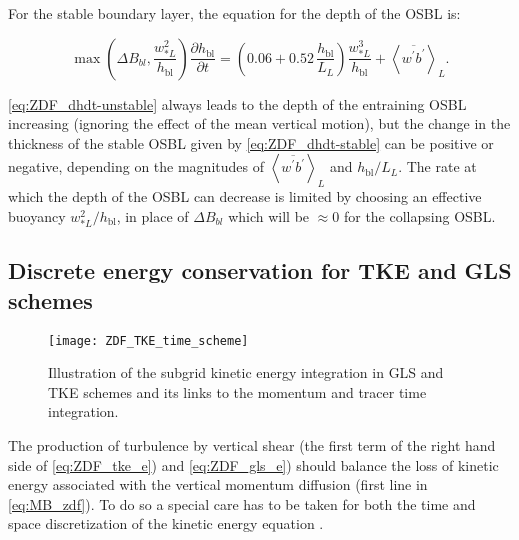 \documentclass[../main/NEMO_manual]{subfiles}
\begin{document}
For the stable boundary layer, the equation for the depth of the OSBL is:

\begin{equation}
  \label{eq:ZDF_dhdt-stable}
\max\left(\Delta B_{bl},\frac{w_{*L}^2}{h_\mathrm{bl}}\right)\frac{\partial h_\mathrm{bl}}{\partial t} = \left(0.06 + 0.52\,\frac{ h_\mathrm{bl}}{L_L}\right) \frac{w_{*L}^3}{h_\mathrm{bl}} +\left<\overline{w^\prime b^\prime}\right>_L.
\end{equation}

\autoref{eq:ZDF_dhdt-unstable} always leads to the depth of the entraining OSBL increasing (ignoring the effect of the mean vertical motion), but the change in the thickness of the stable OSBL given by \autoref{eq:ZDF_dhdt-stable} can be positive or negative, depending on the magnitudes of $\left<\overline{w^\prime b^\prime}\right>_L$ and $h_\mathrm{bl}/L_L$. The rate at which the depth of the OSBL can decrease is limited by choosing an effective buoyancy $w_{*L}^2/h_\mathrm{bl}$, in place of $\Delta B_{bl}$ which will be $\approx 0$ for the collapsing OSBL.


\subsection[ Discrete energy conservation for TKE and GLS schemes]{Discrete energy conservation for TKE and GLS schemes}
\label{subsec:ZDF_tke_ene}

\begin{figure}[!t]
  \centering
  \texttt{[image: ZDF\_TKE\_time\_scheme]}
  \caption[Subgrid kinetic energy integration in GLS and TKE schemes]{
    Illustration of the subgrid kinetic energy integration in GLS and TKE schemes and
    its links to the momentum and tracer time integration.}
  \label{fig:ZDF_TKE_time_scheme}
\end{figure}

The production of turbulence by vertical shear (the first term of the right hand side of
\autoref{eq:ZDF_tke_e}) and  \autoref{eq:ZDF_gls_e}) should balance the loss of kinetic energy associated with the vertical momentum diffusion
(first line in \autoref{eq:MB_zdf}).
To do so a special care has to be taken for both the time and space discretization of
the kinetic energy equation \citep{burchard_OM02,marsaleix.auclair.ea_OM08}.
\end{document}
